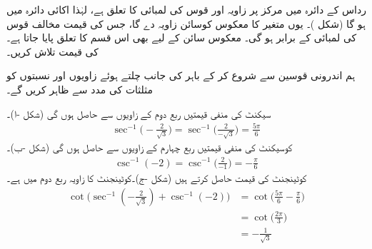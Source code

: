 رداس  کے دائرہ میں مرکز پر زاویہ  اور قوس کی لمبائی  کا تعلق  ہے، لہٰذا  اکائی دائرہ میں  ہو گا (شکل )۔ یوں متغیر  کا معکوس کوسائن  زاویہ دے گا، جس کی قیمت مخالف قوس کی لمبائی  کے برابر ہو گی۔ معکوس سائن کے لیے بھی اس قسم کا تعلق پایا جاتا ہے۔
 کی قیمت تلاش کریں۔

ہم  اندرونی قوسین سے شروع کر کے  باہر کی جانب چلتے ہوئے زاویوں اور نسبتوں کو مثلثات   کی مدد سے ظاہر کریں گے۔

\quad
سیکنٹ کی منفی قیمتیں ربع دوم کے زاویوں سے حاصل ہوں گی (شکل -ا)۔
\begin{align*}
\sec^{-1}\big(-\frac{2}{\sqrt{3}}\big)=\sec^{-1}\big(\frac{2}{-\sqrt{3}}\big)=\frac{5\pi}{6}
\end{align*}
\quad
کوسیکنٹ کی منفی قیمتیں ربع چہارم کے زاویوں سے حاصل ہوں گی (شکل -ب)۔
\begin{align*}
\csc^{-1}(-2)=\csc^{-1}\big(\frac{2}{-1}\big)=-\frac{\pi}{6}
\end{align*}
 \quad
 کوٹینجنٹ کی قیمت   حاصل کرتے ہیں (شکل -ج)۔کوٹینجنٹ  کا زاویہ ربع دوم میں ہے۔
\begin{align*}
\cot\big(\sec^{-1}(-\tfrac{2}{\sqrt{3}})+\csc^{-1}(-2)\big)&=\cot\big(\frac{5\pi}{6}-\frac{\pi}{6}\big)\\
&=\cot\big(\frac{2\pi}{3}\big)\\
&=-\frac{1}{\sqrt{3}}
\end{align*}
